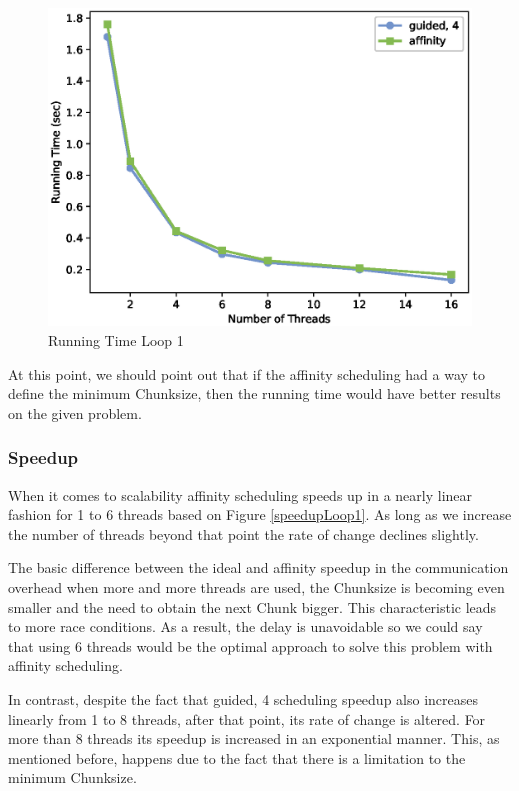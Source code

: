 \documentclass[12pt,a4paper]{article}
\begin{document}
\begin{figure}[h!]
    \centering
    \includegraphics[scale=0.6]{../graphs/loop1_running_time.eps}
    \caption{Running Time Loop 1}
    \label{runningTimeLoop1}
\end{figure}

At this point, we should point out that if the affinity scheduling had a way to define the minimum Chunksize, then the running time would have better results on the given problem.    

\subsubsection{Speedup}

When it comes to scalability affinity scheduling speeds up in a nearly linear fashion for 1 to 6 threads based on Figure \ref{speedupLoop1}. As long as we increase the number of threads beyond that point the rate of change declines slightly.

The basic difference between the ideal and affinity speedup in the communication overhead when more and more threads are used, the Chunksize is becoming even smaller and the need to obtain the next Chunk bigger. This characteristic leads to more race conditions. As a result, the delay is unavoidable so we could say that using 6 threads would be the optimal approach to solve this problem with affinity scheduling.

In contrast, despite the fact that guided, 4 scheduling speedup also increases linearly from 1 to 8 threads, after that point, its rate of change is altered. For more than 8 threads its speedup is increased in an exponential manner. This, as mentioned before, happens due to the fact that there is a limitation to the minimum Chunksize.
\end{document}
